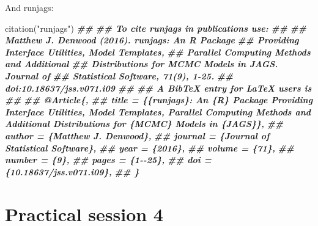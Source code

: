 \documentclass[
  ignorenonframetext,
  aspectratio=169,
]{beamer}
\newenvironment{Shaded}{\begin{snugshade}}{\end{snugshade}}
\newcommand{\DocumentationTok}[1]{\textcolor[rgb]{0.56,0.35,0.01}{\textbf{\textit{#1}}}}
\newcommand{\FunctionTok}[1]{\textcolor[rgb]{0.00,0.00,0.00}{#1}}
\newcommand{\NormalTok}[1]{#1}
\newcommand{\StringTok}[1]{\textcolor[rgb]{0.31,0.60,0.02}{#1}}
\begin{document}
\begin{frame}[fragile]
And runjags:

\scriptsize

\begin{Shaded}
\begin{Highlighting}[]
\FunctionTok{citation}\NormalTok{(}\StringTok{"runjags"}\NormalTok{)}
\DocumentationTok{\#\# }
\DocumentationTok{\#\# To cite runjags in publications use:}
\DocumentationTok{\#\# }
\DocumentationTok{\#\#   Matthew J. Denwood (2016). runjags: An R Package}
\DocumentationTok{\#\#   Providing Interface Utilities, Model Templates,}
\DocumentationTok{\#\#   Parallel Computing Methods and Additional}
\DocumentationTok{\#\#   Distributions for MCMC Models in JAGS. Journal of}
\DocumentationTok{\#\#   Statistical Software, 71(9), 1{-}25.}
\DocumentationTok{\#\#   doi:10.18637/jss.v071.i09}
\DocumentationTok{\#\# }
\DocumentationTok{\#\# A BibTeX entry for LaTeX users is}
\DocumentationTok{\#\# }
\DocumentationTok{\#\#   @Article\{,}
\DocumentationTok{\#\#     title = \{\{runjags\}: An \{R\} Package Providing Interface Utilities, Model Templates, Parallel Computing Methods and Additional Distributions for \{MCMC\} Models in \{JAGS\}\},}
\DocumentationTok{\#\#     author = \{Matthew J. Denwood\},}
\DocumentationTok{\#\#     journal = \{Journal of Statistical Software\},}
\DocumentationTok{\#\#     year = \{2016\},}
\DocumentationTok{\#\#     volume = \{71\},}
\DocumentationTok{\#\#     number = \{9\},}
\DocumentationTok{\#\#     pages = \{1{-}{-}25\},}
\DocumentationTok{\#\#     doi = \{10.18637/jss.v071.i09\},}
\DocumentationTok{\#\#   \}}
\end{Highlighting}
\end{Shaded}

\normalsize
\end{frame}

\hypertarget{practical-session-4}{%
\section{Practical session 4}\label{practical-session-4}}
\end{document}
